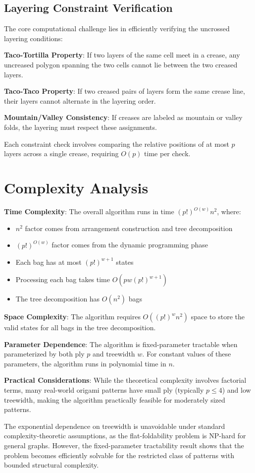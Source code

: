 \subsection{Layering Constraint Verification}

The core computational challenge lies in efficiently verifying the uncrossed layering conditions:

\textbf{Taco-Tortilla Property}: If two layers of the same cell meet in a crease, any uncreased polygon spanning the two cells cannot lie between the two creased layers.

\textbf{Taco-Taco Property}: If two creased pairs of layers form the same crease line, their layers cannot alternate in the layering order.

\textbf{Mountain/Valley Consistency}: If creases are labeled as mountain or valley folds, the layering must respect these assignments.

Each constraint check involves comparing the relative positions of at most $p$ layers across a single crease, requiring $O(p)$ time per check.

\section{Complexity Analysis}

\textbf{Time Complexity}: The overall algorithm runs in time $(p!)^{O(w)}n^2$, where:
\begin{itemize}
\item $n^2$ factor comes from arrangement construction and tree decomposition
\item $(p!)^{O(w)}$ factor comes from the dynamic programming phase
\item Each bag has at most $(p!)^{w+1}$ states
\item Processing each bag takes time $O(pw(p!)^{w+1})$
\item The tree decomposition has $O(n^2)$ bags
\end{itemize}

\textbf{Space Complexity}: The algorithm requires $O((p!)^w n^2)$ space to store the valid states for all bags in the tree decomposition.

\textbf{Parameter Dependence}: The algorithm is fixed-parameter tractable when parameterized by both ply $p$ and treewidth $w$. For constant values of these parameters, the algorithm runs in polynomial time in $n$.

\textbf{Practical Considerations}: While the theoretical complexity involves factorial terms, many real-world origami patterns have small ply (typically $p \leq 4$) and low treewidth, making the algorithm practically feasible for moderately sized patterns.

The exponential dependence on treewidth is unavoidable under standard complexity-theoretic assumptions, as the flat-foldability problem is NP-hard for general graphs. However, the fixed-parameter tractability result shows that the problem becomes efficiently solvable for the restricted class of patterns with bounded structural complexity.
